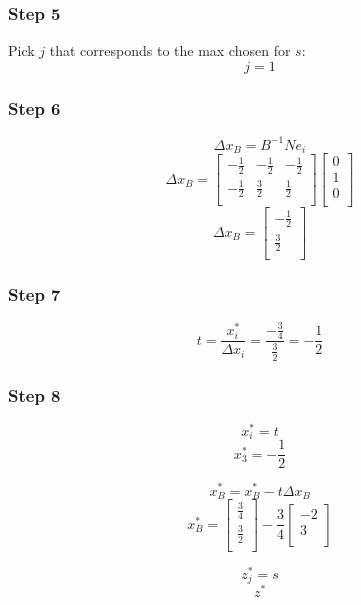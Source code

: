 \documentclass[14pt]{extarticle}
\begin{document}
\subsubsection*{Step 5}
Pick $j$ that corresponds to the max chosen for $s$:
\[
    j = 1
\]

\subsubsection*{Step 6}
\[
    \Delta x_B = B^{-1}N e_i
\]
\[
    \Delta x_B =
    \begin{bmatrix}
        -\frac{1}{2} & -\frac{1}{2} & -\frac{1}{2} \\
        -\frac{1}{2} & \frac{3}{2} & \frac{1}{2} \\
    \end{bmatrix}
    \begin{bmatrix}
        0 \\
        1 \\
        0 \\
    \end{bmatrix}
\]
\[
    \Delta x_B =
    \begin{bmatrix}
        -\frac{1}{2} \\
        \frac{3}{2} \\
    \end{bmatrix}
\]

\subsubsection*{Step 7}
\[
    t = \frac{x^*_i}{\Delta x_i} = \frac{-\frac{3}{4}}{\frac{3}{2}} = - \frac{1}{2}
\]

\subsubsection*{Step 8}
\[
    x^*_i = t
\]
\[
    x^*_3 = -\frac{1}{2}
\]

\[
    x^*_B = x^*_B - t \Delta x_B
\]
\[
    x^*_B = \begin{bmatrix}
        \frac{3}{4} \\
        \frac{3}{2} \\
    \end{bmatrix}
    - \frac{3}{4} \begin{bmatrix}
        -2 \\
        3 \\
    \end{bmatrix}
\]


\[
    z^*_j = s
\]
\[
    z^*
\]
\end{document}
